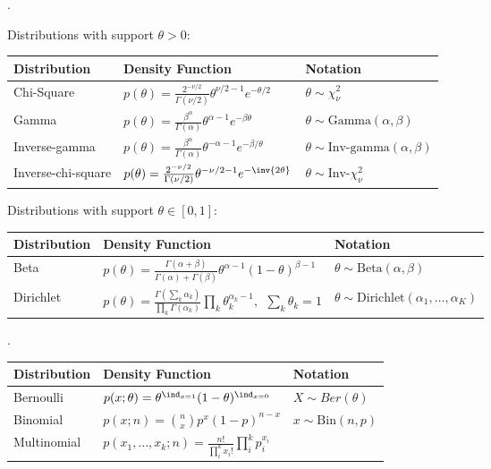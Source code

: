 \documentclass[11pt]{article}
\newcommand\myspace[1][]{\vspace{#1\bigskipamount}}
\newcommand\p{\Needspace{10\baselineskip} \noindent}
\begin{document}

\p {}.

Distributions with support $\theta > 0$:

\begin{tabular}{l | l | l}
	Distribution & Density Function & Notation \\ \hline \hline 
	Chi-Square 
		& $p(\theta) = \frac{2^{-\nu/2}}{\Gamma(\nu/2)} \theta^{\nu/2 - 1} e^{-\theta/2}$ 
		& $\theta \sim \chi_{\nu}^2$ \\ \hline 
	Gamma 
		&	$p(\theta) = \frac{\beta^{\alpha}}{\Gamma(\alpha)} \theta^{\alpha - 1} e^{-\beta\theta}$
		& $\theta \sim \text{Gamma}(\alpha, \beta)$ \\ \hline
	Inverse-gamma 
		& $p(\theta) = \frac{\beta^{\alpha}}{\Gamma(\alpha)} \theta^{- \alpha - 1} e^{-\beta / \theta}$
		& $\theta \sim \text{Inv-gamma}(\alpha, \beta)$ \\ \hline 
	Inverse-chi-square 
		& $p(\theta) = \frac{2^{-\nu/2}}{\Gamma(\nu/2)} \theta^{- \nu/2 - 1} e^{-\inv{2\theta}}$ 
		& $\theta \sim \text{Inv-} \chi_{\nu}^2$ \\ \hline 
\end{tabular}

Distributions with support $\theta \in [0, 1]$:

\begin{tabular}{l | l | l}
	Distribution & Density Function & Notation \\ \hline \hline 
	Beta 
		& $p(\theta) =  \frac{\Gamma(\alpha + \beta)}{\Gamma(\alpha) + \Gamma(\beta)}  \theta^{\alpha - 1}(1 - \theta)^{\beta - 1} $ 
		& $\theta \sim \text{Beta}(\alpha, \beta)$ \\ \hline
	Dirichlet 
		& $p(\theta) =  \frac{\Gamma(\sum_k \alpha_k)}{\prod_k \Gamma(\alpha_k)} \prod_k \theta_k^{\alpha_k - 1}, ~~ \sum_k \theta_k = 1$ 
		& $\theta \sim \text{Dirichlet}(\alpha_1, \ldots, \alpha_K)$ \\ \hline 
\end{tabular}

\myspace
\p {}.

\begin{tabular}{l | l | l}
	Distribution & Density Function & Notation \\ \hline \hline 
	Bernoulli 
		& $p(x; \theta) = \theta^{\ind_{x=1}} (1 - \theta)^{\ind_{x=0}}$ 
		& $X \sim Ber(\theta)$ \\ \hline 
	Binomial 
		& $p(x; n) = \binom{n}{x} p^x (1 - p)^{n - x}$ 
		& $x \sim \text{Bin}(n, p)$ \\ \hline  
	Multinomial 
		& $p(x_1,\ldots,x_k; n) = \frac{n!}{\prod_i^k x_i!} \prod_i^k p_i^{x_i}  $ 
		& \\ \hline
\end{tabular}
\end{document}
